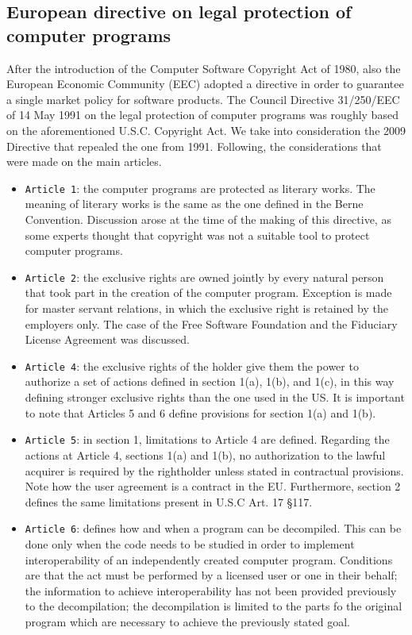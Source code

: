 \subsection*{European directive on legal protection of computer programs}

After the introduction of the Computer Software Copyright Act of 1980, also the European Economic Community (EEC) adopted a directive in order to guarantee a single market policy for software products. The Council Directive 31/250/EEC of 14 May 1991 on the legal protection of computer programs was roughly based on the aforementioned U.S.C. Copyright Act. We take into consideration the 2009 Directive that repealed the one from 1991. Following, the considerations that were made on the main articles.

\begin{itemize}
    \item \texttt{Article 1}: the computer programs are protected as literary works. The meaning of literary works is the same as the one defined in the Berne Convention. Discussion arose at the time of the making of this directive, as some experts thought that copyright was not a suitable tool to protect computer programs.
    \item \texttt{Article 2}: the exclusive rights are owned jointly by every natural person that took part in the creation of the computer program. Exception is made for master servant relations, in which the exclusive right is retained by the employers only. The case of the Free Software Foundation and the Fiduciary License Agreement was discussed.
    \item \texttt{Article 4}: the exclusive rights of the holder give them the power to authorize a set of actions defined in section 1(a), 1(b), and 1(c), in this way defining stronger exclusive rights than the one used in the US. It is important to note that Articles 5 and 6 define provisions for section 1(a) and 1(b).
    \item \texttt{Article 5}: in section 1, limitations to Article 4 are defined. Regarding the actions at Article 4, sections 1(a) and 1(b), no authorization to the lawful acquirer is required by the rightholder unless stated in contractual provisions. Note how the user agreement is a contract in the EU. Furthermore, section 2 defines the same limitations present in U.S.C Art. 17 \S 117.
    \item \texttt{Article 6}: defines how and when a program can be decompiled. This can be done only when the code needs to be studied in order to implement interoperability of an independently created computer program. Conditions are that the act must be performed by a licensed user or one in their behalf; the information to achieve interoperability has not been provided previously to the decompilation; the decompilation is limited to the parts fo the original program which are necessary to achieve the previously stated goal.
\end{itemize}

